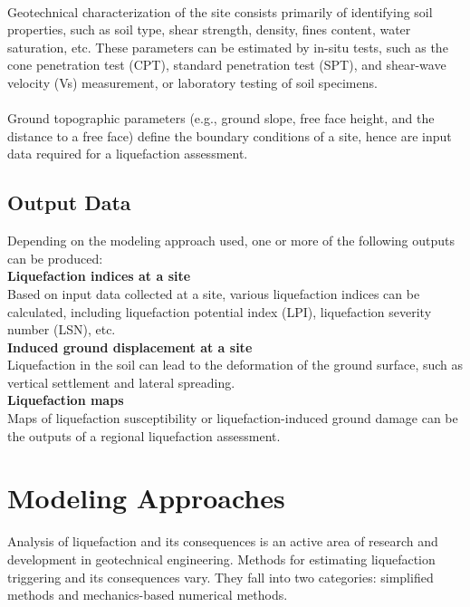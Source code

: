 \\
Geotechnical characterization of the site consists primarily of identifying soil properties, such as soil type, shear strength, density, fines content, water saturation, etc. These parameters can be estimated by in-situ tests, such as the cone penetration test (CPT), standard penetration test (SPT), and shear-wave velocity (Vs) measurement, or laboratory testing of soil specimens.\\

\\
Ground topographic parameters (e.g., ground slope, free face height, and the distance to a free face) define the boundary conditions of a site, hence are input data required for a liquefaction assessment. 


\subsection{Output Data}
\label{subsec:eq_liquefaction_output}
Depending on the modeling approach used, one or more of the following outputs can be produced:\\

\noindent\textbf{Liquefaction indices at a site}\\
Based on input data collected at a site, various liquefaction indices can be calculated, including liquefaction potential index (LPI), liquefaction severity number (LSN), etc. \\

\noindent\textbf{Induced ground displacement at a site}\\
Liquefaction in the soil can lead to the deformation of the ground surface, such as vertical settlement and lateral spreading. \\

\noindent\textbf{Liquefaction maps}\\
Maps of liquefaction susceptibility or liquefaction-induced ground damage can be the outputs of a regional liquefaction assessment. 

\section{Modeling Approaches}
\label{sec:eq_liq_methods}

Analysis of liquefaction and its consequences is an active area of research and development in geotechnical engineering. Methods for estimating liquefaction triggering and its consequences vary. They fall into two categories: simplified methods and mechanics-based numerical methods.

